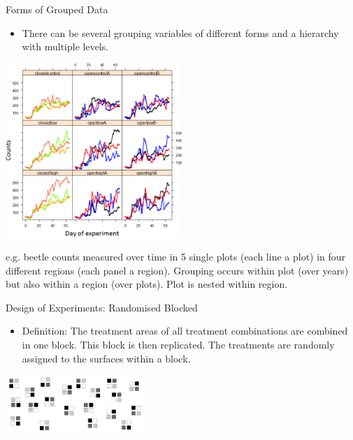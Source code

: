\documentclass{beamer}
\begin{document}
\begin{frame}{Forms of Grouped Data}
  \begin{itemize}
    \item There can be several grouping variables of different forms and a hierarchy with multiple levels. 
  \end{itemize}
  \begin{center}
    \includegraphics[width=0.5\textwidth]{lectures/day_1_intro_to_mems/figures/counts.png} %
  \end{center}
      e.g. beetle counts measured over time in 5 single plots (each line a plot) in four different regions (each panel a region). Grouping occurs within plot (over years) but also within a region (over plots). Plot is nested within region. 
\end{frame}



\begin{frame}{Design of Experiments: Randomised Blocked}
  \begin{itemize}
    \item Definition: The treatment areas of all treatment combinations are combined in one block. This block is then replicated. The treatments are randomly assigned to the surfaces within a block.
  \end{itemize}
  \begin{center}
    \includegraphics[width=0.4\textwidth]{lectures/day_1_intro_to_mems/figures/randomisedblockfig.png}
  \end{center}
\end{frame}
\end{document}
